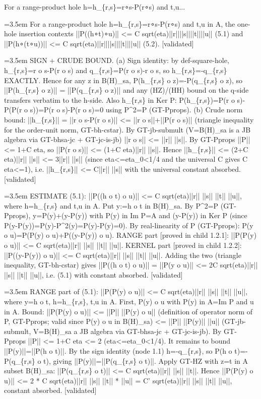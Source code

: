 \documentclass{article}
\newcommand{\step}[1]{\par\noindent\hangindent=3.5em\hangafter=1%
  \makebox[3.5em][l]{\textbf{#1.}}}
\newcommand{\steptag}[1]{\hfill{\small\textsf{[#1]}}}
\begin{document}
\begin{proofbox}{For a range-product hole h=h\_\{r,s\}=r∘s-P(r∘s) and t,u...}
\step{1} For a range-product hole h=h\_\{r,s\}=r∘s-P(r∘s) and t,u in A, the one-hole insertion contexts ||P((h∘t)∘u)|| <= C sqrt(eta)||r||||s||||t||||u|| (5.1) and ||P(h∘(t∘u))|| <= C sqrt(eta)||r||||s||||t||||u|| (5.2). \steptag{validated} \\[6pt]
\step{1.1} SIGN + CRUDE BOUND. (a) Sign identity: by def-square-hole, h\_\{r,s\}=r o s-P(r o s) and q\_\{r,s\}=P(r o s)-r o s, so h\_\{r,s\}=-q\_\{r,s\} EXACTLY. Hence for any z in B(H)\_sa, P(h\_\{r,s\} o z)=-P(q\_\{r,s\} o z), so ||P(h\_\{r,s\} o z)|| = ||P(q\_\{r,s\} o z)|| and any (HZ)/(HH) bound on the q-side transfers verbatim to the h-side. Also h\_\{r,s\} in Ker P: P(h\_\{r,s\})=P(r o s)-P(P(r o s))=P(r o s)-P(r o s)=0 using P\textasciicircum{}2=P (GT-Pprops). (b) Crude norm bound: ||h\_\{r,s\}|| = ||r o s-P(r o s)|| <= ||r o s||+||P(r o s)|| (triangle inequality for the order-unit norm, GT-bh-cstar). By GT-jb-submult (V=B(H)\_sa is a JB algebra via GT-bhsa-jc + GT-jc-is-jb) ||r o s|| <= ||r|| ||s||. By GT-Pprops ||P|| <= 1+C eta, so ||P(r o s)|| <= (1+C eta)||r|| ||s||. Hence ||h\_\{r,s\}|| <= (2+C eta)||r|| ||s|| <= 3||r|| ||s|| (since eta<=eta\_0<1/4 and the universal C gives C eta<=1), i.e. ||h\_\{r,s\}|| <= C||r|| ||s|| with the universal constant absorbed. \steptag{validated} \\[4pt]
\step{1.2} ESTIMATE (5.1): ||P((h o t) o u)|| <= C sqrt(eta)||r|| ||s|| ||t|| ||u||, where h=h\_\{r,s\} and t,u in A. Put y:=h o t in B(H)\_sa. By P\textasciicircum{}2=P (GT-Pprops), y=P(y)+(y-P(y)) with P(y) in Im P=A and (y-P(y)) in Ker P (since P(y-P(y))=P(y)-P\textasciicircum{}2(y)=P(y)-P(y)=0). By real-linearity of P (GT-Pprops): P(y o u)=P(P(y) o u)+P((y-P(y)) o u). RANGE part [proved in child 1.2.1]: ||P(P(y) o u)|| <= C sqrt(eta)||r|| ||s|| ||t|| ||u||. KERNEL part [proved in child 1.2.2]: ||P((y-P(y)) o u)|| <= C sqrt(eta)||r|| ||s|| ||t|| ||u||. Adding the two (triangle inequality, GT-bh-cstar) gives ||P((h o t) o u)|| = ||P(y o u)|| <= 2C sqrt(eta)||r|| ||s|| ||t|| ||u||, i.e. (5.1) with constant absorbed. \steptag{validated} \\[6pt]
\step{1.2.1} RANGE part of (5.1): ||P(P(y) o u)|| <= C sqrt(eta)||r|| ||s|| ||t|| ||u||, where y=h o t, h=h\_\{r,s\}, t,u in A. First, P(y) o u with P(y) in A=Im P and u in A. Bound: ||P(P(y) o u)|| <= ||P|| ||P(y) o u|| (definition of operator norm of P, GT-Pprops; valid since P(y) o u in B(H)\_sa) <= ||P|| ||P(y)|| ||u|| (GT-jb-submult, V=B(H)\_sa a JB algebra via GT-bhsa-jc + GT-jc-is-jb). By GT-Pprops ||P|| <= 1+C eta <= 2 (eta<=eta\_0<1/4). It remains to bound ||P(y)||=||P(h o t)||. By the sign identity (node 1.1) h=-q\_\{r,s\}, so P(h o t)=-P(q\_\{r,s\} o t), giving ||P(y)||=||P(q\_\{r,s\} o t)||. Apply GT-HZ with z=t in A subset B(H)\_sa: ||P(q\_\{r,s\} o t)|| <= C sqrt(eta)||r|| ||s|| ||t||. Hence ||P(P(y) o u)|| <= 2 * C sqrt(eta)||r|| ||s|| ||t|| * ||u|| = C' sqrt(eta)||r|| ||s|| ||t|| ||u||, constant absorbed. \steptag{validated} \\[4pt]

\end{proofbox}
\end{document}
